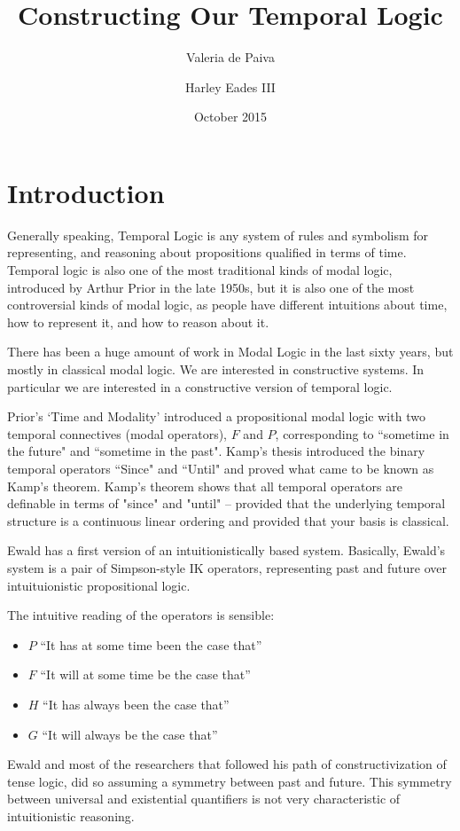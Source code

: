 \documentclass{article}
\title{Constructing Our Temporal Logic}
\author{Valeria de Paiva \and Harley Eades III}
\date{October 2015}
\begin{document}
\maketitle

\section{Introduction}
Generally speaking, Temporal Logic is any system of rules and
symbolism for representing, and reasoning about propositions qualified
in terms of time.  Temporal logic is also one of the most traditional
kinds of modal logic, introduced by Arthur Prior in the late 1950s,
but it is also one of the most controversial kinds of modal logic, as
people have different intuitions about time, how to represent it, and
how to reason about it.

There has been a huge amount of work in Modal Logic in the last sixty
years, but mostly in classical modal logic. We are interested in
constructive systems. In particular we are interested in a
constructive version of temporal logic.

Prior's `Time and Modality' introduced a propositional modal logic
with two temporal connectives (modal operators), $F$ and $P$,
corresponding to ``sometime in the future" and ``sometime in the
past". Kamp's thesis introduced the binary temporal operators ``Since"
and ``Until" and proved what came to be known as Kamp's
theorem. Kamp's theorem shows that all temporal operators are
definable in terms of "since" and "until" -- provided that the
underlying temporal structure is a continuous linear ordering and
provided that your basis is classical.

Ewald \cite{ewald1986} has a first version of an intuitionistically
based system. Basically, Ewald's system is a pair of Simpson-style IK
operators\cite{simpson1994}, representing past and future over
intuituionistic propositional logic.

The intuitive reading of the operators is sensible:
\begin{itemize}
\item $P$ “It has at some time been the case that” 
\item $F$ “It will at some time be the case that” 
\item $H$ “It has always been the case that” 
\item $G$  “It will always be the case that” 
\end{itemize}
Ewald and most of the researchers that followed his path of
constructivization of tense logic, did so assuming a symmetry between
past and future. This symmetry between universal and existential
quantifiers is not very characteristic of intuitionistic reasoning.
\end{document}
